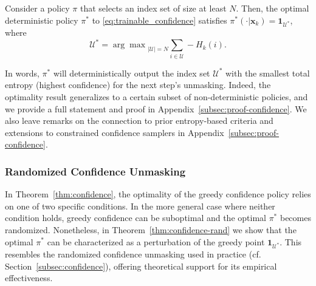 \begin{theorem}[Informal]
    \label{thm:confidence}
     Consider a policy $\pi$ that selects an index set of size at least $N$. Then, the optimal deterministic policy $\pi^*$ to \eqref{eq:trainable_confidence} satisfies $\pi^*(\cdot|\bm x_k)=\mathbf1_{\mathcal U^*}$, where
     $$\mathcal U^*={\arg\max}_{|\mathcal U|=N}\sum_{i\in\mathcal U}-H_k(i).$$
\end{theorem}

 

In words, $\pi^*$ will deterministically output the index set $\mathcal U^*$ with the smallest total entropy (highest confidence) for the next step's unmasking. Indeed, the optimality result generalizes to a certain subset of non-deterministic policies, and we provide a full statement and proof in Appendix~\ref{subsec:proof-confidence}. We also leave remarks on the connection to prior entropy-based criteria and extensions to constrained confidence samplers in Appendix~\ref{subsec:proof-confidence}.

\subsubsection{Randomized Confidence Unmasking}
In Theorem~\ref{thm:confidence}, the optimality of the greedy confidence policy relies on one of two specific conditions. In the more general case where neither condition holds, greedy confidence can be suboptimal and the optimal $\pi^*$ becomes randomized. Nonetheless, in Theorem~\ref{thm:confidence-rand} we show that the optimal $\pi^*$ can be characterized as a perturbation of the greedy point $\mathbf 1_{\mathcal U^*}$. This resembles the randomized confidence unmasking used in practice (cf. Section~\ref{subsec:confidence}), offering theoretical support for its empirical effectiveness.

